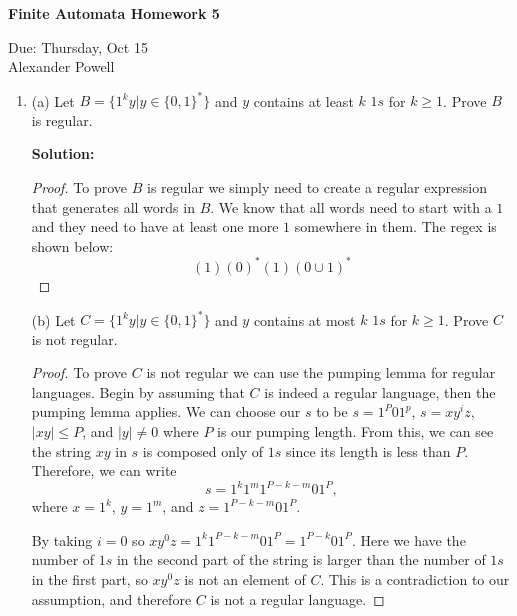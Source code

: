 \documentclass[11pt]{article}
\begin{document}
\begin{center}             %
\begin{LARGE}
{\bf Finite Automata Homework 5}
\end{LARGE}
\vskip 0.25cm      %

Due: Thursday, Oct 15\\  %
Alexander Powell
\end{center}

\begin{enumerate}

\item %
(a) Let $B = \{ 1^ky | y \in \{ 0,1 \}^* \}$ and $y$ contains at least $k$ $1s$ for $k \geq 1$.  Prove $B$ is regular.  

\textbf{Solution: }
\begin{proof}

To prove $B$ is regular we simply need to create a regular expression that generates all words in $B$.  We know that all words need to start with a $1$ and they need to have at least one more $1$ somewhere in them.  The regex is shown below:
$$ (1)(0)^*(1)(0 \cup 1)^* $$

\end{proof}

(b) Let $C = \{ 1^ky | y \in \{ 0,1 \}^* \}$ and $y$ contains at most $k$ $1s$ for $k \geq 1$.  Prove $C$ is not regular.  

\begin{proof}

To prove $C$ is not regular we can use the pumping lemma for regular languages.  Begin by assuming that $C$ is indeed a regular language, then the pumping lemma applies.  We can choose our $s$ to be $s = 1^P01^p$, $s = xy^iz$, $|xy| \leq P$, and $|y| \neq 0$ where $P$ is our pumping length.  From this, we can see the string $xy$ in $s$ is composed only of $1s$ since its length is less than $P$.  Therefore, we can write $$s = 1^k1^m1^{P-k-m}01^P,$$ where $x = 1^k$, $y = 1^m$, and $z = 1^{P-k-m}01^P$.  

By taking $i = 0$ so $xy^0z = 1^k1^{P-k-m}01^P = 1^{P-k}01^P$.  Here we have the number of $1s$ in the second part of the string is larger than the number of $1s$ in the first part, so $xy^0z$ is not an element of $C$.  This is a contradiction to our assumption, and therefore $C$ is not a regular language.  

\end{proof}


\end{enumerate}
\end{document}
